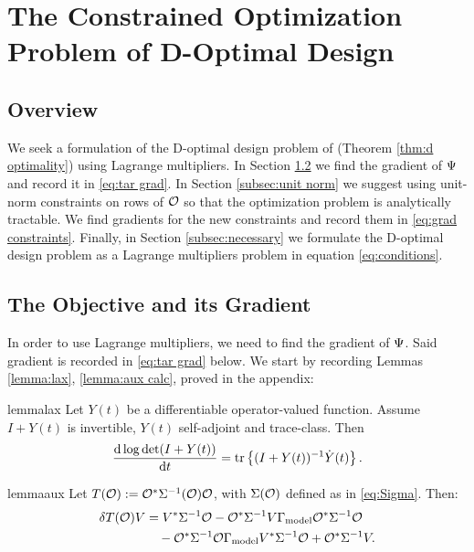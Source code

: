 \section{The Constrained Optimization Problem of D-Optimal Design}\label{section:D and grad}

\subsection{Overview}
We seek a formulation of the D-optimal design problem of
\cite{AlexanderianGloorGhattas14} (Theorem \ref{thm:d optimality})
using Lagrange multipliers. In Section \ref{section:objective} we find
the gradient of $\Psi$ and record it in \eqref{eq:tar grad}. In
Section \ref{subsec:unit norm} we suggest using unit-norm constraints
on rows of $\mathcal{O}$ so that the optimization problem is analytically
tractable. We find gradients for the new constraints and record them
in \eqref{eq:grad constraints}. Finally, in Section
\ref{subsec:necessary} we formulate the D-optimal design problem as a
Lagrange multipliers problem in equation \eqref{eq:conditions}.


\subsection{The Objective and its Gradient}\label{section:objective}
In order to use Lagrange multipliers, we need to find the gradient of
$\Psi$. Said gradient is recorded in \eqref{eq:tar grad} below. We
start by recording Lemmas \ref{lemma:lax}, \ref{lemma:aux calc},
proved in the appendix:

\begin{restatable*}{lemma}{lax}\label{lemma:lax}
  Let $Y(t)$ be a differentiable operator-valued function. Assume 
  $I+Y(t)$ is invertible, $Y(t)$ self-adjoint and trace-class. Then
  \begin{equation*}
    \frac{\der \log \det (I+Y(t))}{\der t} = \tr{(I+Y(t))^{-1} \dot{Y}(t)}.
  \end{equation*}
\end{restatable*}

\begin{restatable*}{lemma}{aux}\label{lemma:aux calc}
  Let $T(\mathcal{O}) := \mathcal{O}^* \Sigma^{-1}(\mathcal{O})\mathcal{O}$, with $\Sigma(\mathcal{O})$
  defined as in \eqref{eq:Sigma}. Then:
  \begin{align*}
    \delta T(\obs)V &= V^* \Sigma^{-1} \obs 
    - \obs^*\Sigma^{-1} V\modcov \obs^* \Sigma^{-1}\obs \\
    &\ \ \ - \obs^* \Sigma^{-1} \obs \modcov V^* \Sigma^{-1}\obs
    + \obs^* \Sigma^{-1} V.
  \end{align*}
\end{restatable*}

